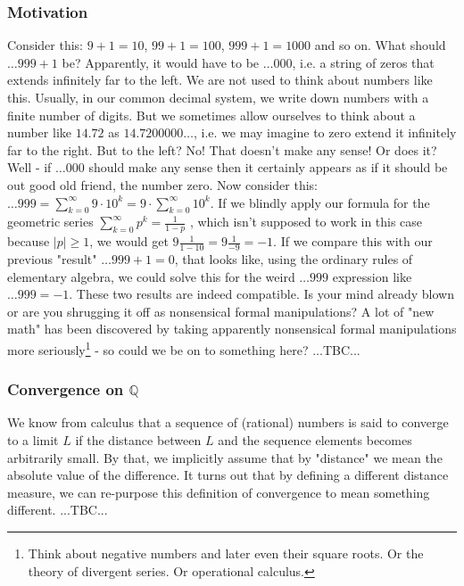 \subsubsection{Motivation}
Consider this: $9 + 1 = 10$, $99 + 1 = 100$, $999 + 1 = 1000$ and so on. What should $\ldots 999 + 1$ be? Apparently, it would have to be $\ldots 000$, i.e. a string of zeros that extends infinitely far to the left. We are not used to think about numbers like this. Usually, in our common decimal system, we write down numbers with a finite number of digits. But we sometimes allow ourselves to think about a number like $14.72$ as $14.7200000\ldots$, i.e. we may imagine to zero extend it infinitely far to the right. But to the left? No! That doesn't make any sense! Or does it? Well - if $\ldots 000$ should make any sense then it certainly appears as if it should be out good old friend, the number zero. Now consider this: $\ldots 999  = \sum_{k=0}^{\infty} 9 \cdot 10^k = 9 \cdot \sum_{k=0}^{\infty} 10^k$. If we blindly apply our formula for the geometric series $\sum_{k=0}^{\infty} p^k = \frac{1}{1-p}$ , which isn't supposed to work in this case because $|p| \geq 1$, we would get $9 \frac{1}{1-10} = 9 \frac{1}{-9} = -1$. If we compare this with our previous "result" $\ldots 999 + 1 = 0$, that looks like, using the ordinary rules of elementary algebra, we could solve this for the weird $\ldots999$ expression like $\ldots 999 = -1$. These two results are indeed compatible. Is your mind already blown or are you shrugging it off as nonsensical formal manipulations? A lot of "new math" has been discovered by taking apparently nonsensical formal manipulations more seriously\footnote{Think about negative numbers and later even their square roots. Or the theory of divergent series. Or operational calculus.} - so could we be on to something here?  ...TBC...





\subsubsection{Convergence on $\mathbb{Q}$}
We know from calculus that a sequence of (rational) numbers is said to converge to a limit $L$ if the distance between $L$ and the sequence elements becomes arbitrarily small. By that, we implicitly assume that by "distance" we mean the absolute value of the difference. It turns out that by defining a different distance measure, we can re-purpose this definition of convergence to mean something different. ...TBC...

